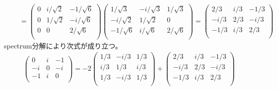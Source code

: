 \documentclass[dvipdfmx]{jsarticle}
\begin{document}
\begin{align*}
&\quad = \begin{pmatrix}
0 & {i}/{\sqrt{2}} & - {1}/{\sqrt{6}} \\
0 & {1}/{\sqrt{2}} & - {i}/{\sqrt{6}} \\
0 & 0 & {2}/{\sqrt{6}} \\
\end{pmatrix}\begin{pmatrix}
{1}/{\sqrt{3}} & - {i}/{\sqrt{3}} & {1}/{\sqrt{3}} \\
 - {i}/{\sqrt{2}} & {1}/{\sqrt{2}} & 0 \\
 - {1}/{\sqrt{6}} & {i}/{\sqrt{6}} & {2}/{\sqrt{6}} \\
\end{pmatrix} = \begin{pmatrix}
{2}/{3} & {i}/{3} & - {1}/{3} \\
 - {i}/{3} & {2}/{3} & - {i}/{3} \\
 - {1}/{3} & {i}/{3} & {2}/{3} \\
\end{pmatrix}
\end{align*}
spectrum分解により次式が成り立つ。
\begin{align*}
\begin{pmatrix}
0 & i & - 1 \\
 - i & 0 & - i \\
 - 1 & i & 0 \\
\end{pmatrix} = - 2\begin{pmatrix}
{1}/{3} & - {i}/{3} & {1}/{3} \\
{i}/{3} & {1}/{3} & {i}/{3} \\
{1}/{3} & - {i}/{3} & {1}/{3} \\
\end{pmatrix} + \begin{pmatrix}
{2}/{3} & {i}/{3} & - {1}/{3} \\
 - {i}/{3} & {2}/{3} & - {i}/{3} \\
 - {1}/{3} & {i}/{3} & {2}/{3} \\
\end{pmatrix}
\end{align*}
\end{document}

